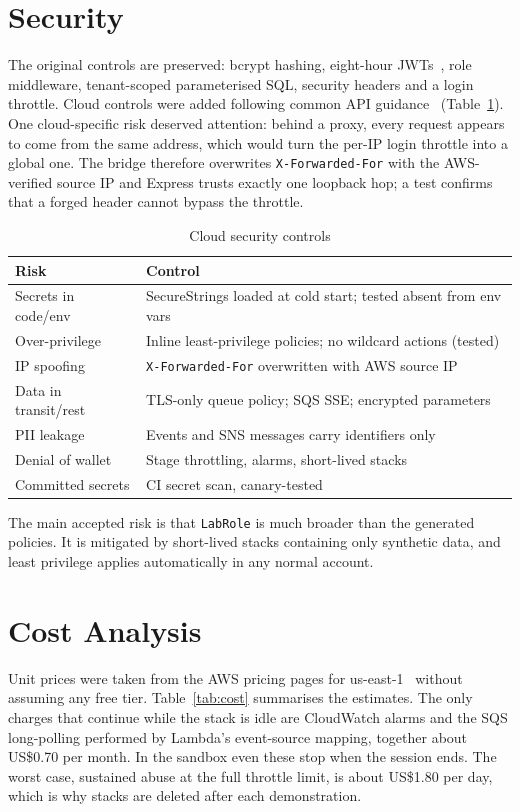\documentclass[conference]{IEEEtran}
\newcommand{\code}[1]{\texttt{\small #1}}
\begin{document}
\section{Security}
The original controls are preserved: bcrypt hashing, eight-hour JWTs~\cite{rfc7519}, role
middleware, tenant-scoped parameterised SQL, security headers and a login throttle. Cloud
controls were added following common API guidance~\cite{owasp} (Table~\ref{tab:security}). One cloud-specific risk deserved attention:
behind a proxy, every request appears to come from the same address, which would turn the
per-IP login throttle into a global one. The bridge therefore overwrites
\code{X-Forwarded-For} with the AWS-verified source IP and Express trusts exactly one
loopback hop; a test confirms that a forged header cannot bypass the throttle.

\begin{table}[t]
\caption{Cloud security controls}
\label{tab:security}
\centering
\footnotesize
\begin{tabularx}{\columnwidth}{@{}lX@{}}
\toprule
Risk & Control \\
\midrule
Secrets in code/env & SecureStrings loaded at cold start; tested absent from env vars \\
Over-privilege & Inline least-privilege policies; no wildcard actions (tested) \\
IP spoofing & \code{X-Forwarded-For} overwritten with AWS source IP \\
Data in transit/rest & TLS-only queue policy; SQS SSE; encrypted parameters \\
PII leakage & Events and SNS messages carry identifiers only \\
Denial of wallet & Stage throttling, alarms, short-lived stacks \\
Committed secrets & CI secret scan, canary-tested \\
\bottomrule
\end{tabularx}
\end{table}

The main accepted risk is that \code{LabRole} is much broader than the generated policies. It is
mitigated by short-lived stacks containing only synthetic data, and least privilege applies
automatically in any normal account.

\section{Cost Analysis}
Unit prices were taken from the AWS pricing pages for us-east-1~\cite{aws-lambda-pricing,
aws-apigw-pricing} without assuming any free tier. Table~\ref{tab:cost} summarises the
estimates. The only charges that continue while the stack is idle are CloudWatch alarms and
the SQS long-polling performed by Lambda's event-source mapping, together about US\$0.70 per
month. In the sandbox even these stop when the session ends. The worst case, sustained abuse
at the full throttle limit, is about US\$1.80 per day, which is why stacks are deleted after
each demonstration.
\end{document}
